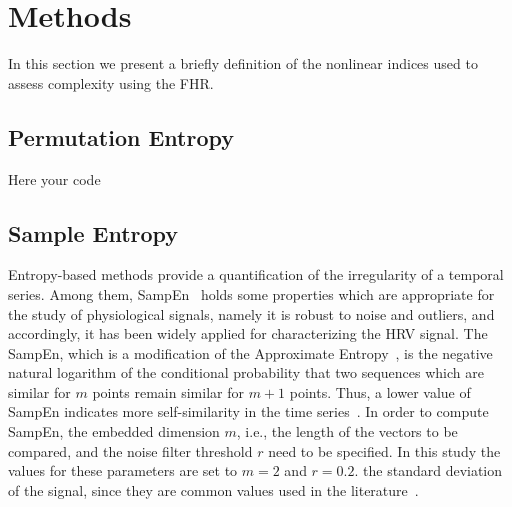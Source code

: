 	\section{Methods} \label{sec:system}
In this section we present a briefly definition of the nonlinear indices used to assess complexity using the FHR.

\subsection{Permutation Entropy}

Here your code

\subsection{Sample Entropy}
Entropy-based methods provide a quantification of the irregularity of a temporal series. Among them, SampEn~\cite{richman00} holds some properties which are appropriate for the study of physiological signals, namely it is robust to noise and outliers, and accordingly, it has been widely applied for characterizing the HRV signal. The SampEn, which is a modification of the Approximate Entropy~\cite{pincus91}, is the negative natural logarithm of the conditional probability that two sequences which are similar for $m$ points remain similar for $m+1$ points. Thus, a lower value of SampEn indicates more self-similarity in the time series~\cite{richman00}. In order to compute SampEn, the embedded dimension $m$, i.e., the length of the vectors to be compared, and the noise filter threshold $r$ need
to be specified. In this study the values for these parameters are set to $m=2$ and $r=0.2 .$ the standard deviation of the signal, since they are common values used in the literature~\cite{pincus91}.

